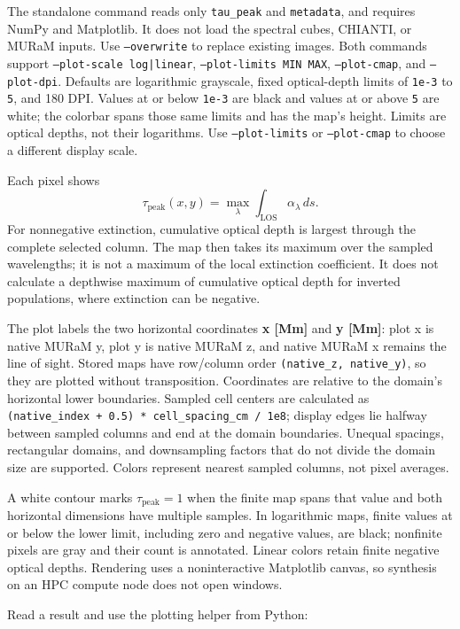 \documentclass[
]{article}
\begin{document}
The standalone command reads only \texttt{tau\_peak} and \texttt{metadata},
and requires NumPy and Matplotlib. It does not load the spectral cubes,
CHIANTI, or MURaM inputs. Use \texttt{--overwrite} to replace existing images.
Both commands support \texttt{--plot-scale log|linear},
\texttt{--plot-limits MIN MAX}, \texttt{--plot-cmap}, and \texttt{--plot-dpi}.
Defaults are logarithmic grayscale, fixed optical-depth limits of \texttt{1e-3}
to \texttt{5}, and 180 DPI. Values at or below \texttt{1e-3} are black and
values at or above \texttt{5} are white; the colorbar spans those same limits
and has the map's height. Limits are optical depths, not their logarithms.
Use \texttt{--plot-limits} or \texttt{--plot-cmap} to choose a different
display scale.

Each pixel shows
\[
\tau_{\mathrm{peak}}(x,y)=\max_\lambda\int_{\mathrm{LOS}}\alpha_\lambda\,ds.
\]
For nonnegative extinction, cumulative optical depth is largest through the
complete selected column. The map then takes its maximum over the sampled
wavelengths; it is not a maximum of the local extinction coefficient. It does
not calculate a depthwise maximum of cumulative optical depth for inverted
populations, where extinction can be negative.

The plot labels the two horizontal coordinates \textbf{x [Mm]} and
\textbf{y [Mm]}: plot x is native MURaM y, plot y is native MURaM z,
and native MURaM x remains the line of sight. Stored maps have row/column
order \texttt{(native\_z, native\_y)}, so they are plotted without transposition.
Coordinates are relative to the domain's horizontal lower boundaries.
Sampled cell centers are calculated as
\texttt{(native\_index + 0.5) * cell\_spacing\_cm / 1e8}; display edges lie
halfway between sampled columns and end at the domain boundaries. Unequal
spacings, rectangular domains, and downsampling factors that do not divide
the domain size are supported. Colors represent nearest sampled columns,
not pixel averages.

A white contour marks \(\tau_{\mathrm{peak}}=1\) when the finite map spans
that value and both horizontal dimensions have multiple samples.
In logarithmic maps, finite values at or below the lower limit, including zero
and negative values, are black; nonfinite pixels are gray and their count is
annotated. Linear colors retain finite negative optical depths. Rendering uses
a noninteractive Matplotlib canvas, so synthesis on an HPC compute node does
not open windows.

Read a result and use the plotting helper from Python:
\end{document}
